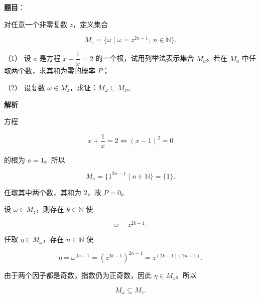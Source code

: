 \begin{answer}

\textbf{题目}：

对任意一个非零复数 $z$，定义集合

\nopagebreak[4]
\[
M_z=\{\omega\mid \omega=z^{2n-1},\ n\in\mathbb N\}.
\]

（1） 设 $a$ 是方程 $x+\dfrac1x=2$ 的一个根，试用列举法表示集合 $M_a$。若在 $M_a$ 中任取两个数，求其和为零的概率 $P$；

（2） 设复数 $\omega\in M_z$，求证：$M_\omega\subseteq M_z$。

\textbf{解析}


方程

\nopagebreak[4]
\[
x+\frac1x=2
\Longleftrightarrow (x-1)^2=0
\]

的根为 $a=1$。所以

\nopagebreak[4]
\[
M_a=\{1^{2n-1}\mid n\in\mathbb N\}=\{1\}.
\]

任取其中两个数，其和为 $2$，故 $P=0$。


设 $\omega\in M_z$，则存在 $k\in\mathbb N$ 使

\nopagebreak[4]
\[
\omega=z^{2k-1}.
\]

任取 $\eta\in M_\omega$，存在 $n\in\mathbb N$ 使

\nopagebreak[4]
\[
\eta=\omega^{2n-1}
=\left(z^{2k-1}\right)^{2n-1}
=z^{(2k-1)(2n-1)}.
\]

由于两个因子都是奇数，指数仍为正奇数，因此 $\eta\in M_z$。所以

\nopagebreak[4]
\[
M_\omega\subseteq M_z.
\]



\end{answer}
